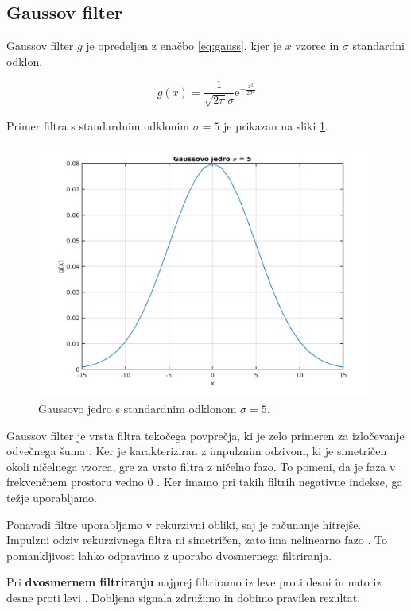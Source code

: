 \subsection{Gaussov filter}\label{sec:gaussov-filter}
Gaussov filter $g$ je opredeljen z enačbo \eqref{eq:gauss}, kjer je $x$ vzorec in $\sigma$ standardni odklon. 


\begin{equation}
g(x) = \frac{1}{\sqrt{2 \pi} \sigma} \mathrm{e}^{-\frac{x^2}{2 \sigma^2}} 
\label{eq:gauss}
\end{equation}


Primer filtra s standardnim odklonim $\sigma = 5$ je prikazan na sliki \ref{fig:gauss}.

\begin{figure}[htb]
\centering
\includegraphics[width=0.7\columnwidth]{./Slike/gauss-kernel.png}
\caption{Gaussovo jedro s standardnim odklonom $\sigma=5$. }
\label{fig:gauss}
\end{figure}


Gaussov filter je vrsta filtra tekočega povprečja, ki je zelo primeren za izločevanje odvečnega šuma \cite{smith1997scientist}. Ker je karakteriziran z impulznim odzivom, ki je simetričen okoli ničelnega vzorca, gre za vrsto filtra z ničelno fazo. To pomeni, da je faza v frekvenčnem prostoru vedno $0$ \cite{smith1997scientist}. Ker imamo pri takih filtrih negativne indekse, ga težje uporabljamo. 

Ponavadi filtre uporabljamo v rekurzivni obliki, saj je računanje hitrejše. Impulzni odziv rekurzivnega filtra ni simetričen, zato ima nelinearno fazo \cite{smith1997scientist}. To pomankljivost lahko odpravimo z uporabo dvosmernega filtriranja.

Pri \textbf{dvosmernem filtriranju} najprej filtriramo iz leve proti desni in nato iz desne proti levi \cite{smith1997scientist}. Dobljena signala združimo in dobimo pravilen rezultat.



